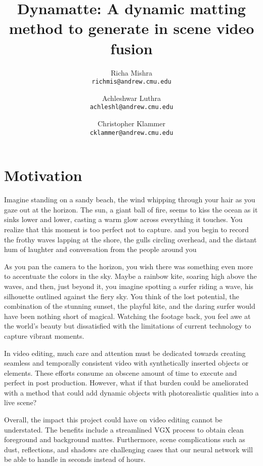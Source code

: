 \documentclass{article}
\title{Dynamatte: A dynamic matting method to generate in scene video fusion}
\author{Richa Mishra \\
\small\texttt{richmis@andrew.cmu.edu}
\and
Achleshwar Luthra \\
\small\texttt{achleshl@andrew.cmu.edu}
\and
Christopher Klammer \\
\small\texttt{cklammer@andrew.cmu.edu}}
\begin{document}
\maketitle


\section{Motivation}

Imagine standing on a sandy beach, the wind whipping through your hair as you gaze out at the horizon. The sun, a giant ball of fire, seems to kiss the ocean as it sinks lower and lower, casting a warm glow across everything it touches. You realize that this moment is too perfect not to capture. and you begin to record the frothy waves lapping at the shore, the gulls circling overhead, and the distant hum of laughter and conversation from the people around you

As you pan the camera to the horizon, you wish there was something even more to accentuate the colors in the sky. Maybe a rainbow kite, soaring high above the waves, and then, just beyond it, you imagine spotting a surfer riding a wave, his silhouette outlined against the fiery sky. You think of the lost potential, the combination of the stunning sunset, the playful kite, and the daring surfer would have been nothing short of magical. Watching the footage back, you feel awe at the world's beauty but dissatisfied with the limitations of current technology to capture vibrant moments.

In video editing, much care and attention must be dedicated towards creating seamless and temporally consistent video with synthetically inserted objects or elements. These efforts consume an obscene amount of time to execute and perfect in post production. However, what if that burden could be ameliorated with a method that could add dynamic objects with photorealistic qualities into a live scene? 

Overall, the impact this project could have on video editing cannot be understated. The benefits include a streamlined VGX process to obtain clean foreground and background mattes. Furthermore, scene complications such as dust, reflections, and shadows are challenging cases that our neural network will be able to handle in seconds instead of hours.
\end{document}
